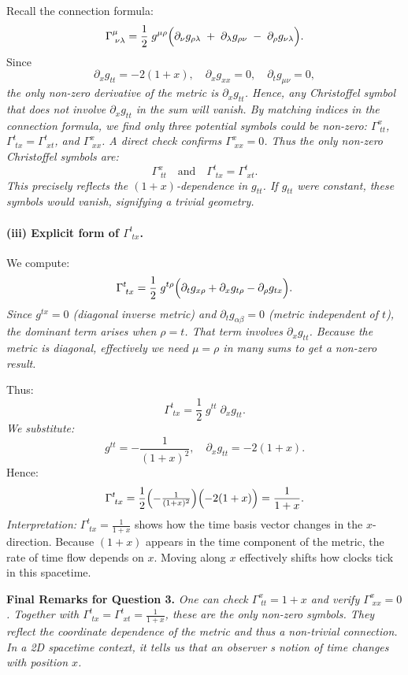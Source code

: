 Recall the connection formula:
\[
\Gamma^{\mu}_{\;\nu\lambda}
=
\frac{1}{2}\;g^{\mu\rho}
\Bigl(
\partial_\nu g_{\rho\lambda}
\;+\;
\partial_\lambda g_{\rho\nu}
\;-\;
\partial_\rho g_{\nu\lambda}
\Bigr).
\]
Since
\[
\partial_x g_{tt} = -2(1+x),
\quad
\partial_x g_{xx} = 0,
\quad
\partial_t g_{\mu\nu} = 0,
\]
\emph{the only non-zero derivative of the metric is \(\partial_x g_{tt}\). Hence, any Christoffel symbol that does not involve \(\partial_x g_{tt}\) in the sum will vanish. By matching indices in the connection formula, we find only three potential symbols could be non-zero: \(\Gamma^x_{\;tt}\), \(\Gamma^t_{\;tx} = \Gamma^t_{\;xt}\), and \(\Gamma^x_{\;xx}\). A direct check confirms \(\Gamma^x_{\;xx} = 0\). Thus the only non-zero Christoffel symbols are:}
\[
\Gamma^x_{\;tt}
\quad \text{and} \quad
\Gamma^t_{\;tx} = \Gamma^t_{\;xt}.
\]
\emph{This precisely reflects the \((1+x)\)-dependence in \(g_{tt}\). If \(g_{tt}\) were constant, these symbols would vanish, signifying a trivial geometry.}

\paragraph{(iii) Explicit form of \(\Gamma^{t}_{\;tx}\).}

We compute:
\[
\Gamma^{t}_{\;tx}
=
\frac{1}{2}\;g^{t\rho}
\Bigl(
\partial_t g_{x\rho}
+
\partial_x g_{t\rho}
-
\partial_\rho g_{tx}
\Bigr).
\]
\emph{Since \(g^{tx} = 0\) (diagonal inverse metric) and \(\partial_t g_{\alpha\beta} = 0\) (metric independent of \(t\)), the dominant term arises when \(\rho = t\). That term involves \(\partial_x g_{tt}\). Because the metric is diagonal, effectively we need \(\mu = \rho\) in many sums to get a non-zero result.}

Thus:
\[
\Gamma^{t}_{\;tx}
=
\frac{1}{2}\;g^{tt}\;\partial_x g_{tt}.
\]
\emph{We substitute:}
\[
g^{tt} = -\frac{1}{(1+x)^2},
\quad
\partial_x g_{tt} = -2(1+x).
\]
Hence:
\[
\Gamma^t_{\;tx}
=
\frac12
\Bigl(-\tfrac{1}{(1+x)^2}\Bigr)
\Bigl(-2(1+x)\Bigr)
=
\frac{1}{1+x}.
\]
\emph{Interpretation:}
\(\Gamma^{t}_{\;tx} = \frac{1}{1+x}\) shows how the time basis vector changes in the \(x\)-direction. Because \((1+x)\) appears in the time component of the metric, the rate of time flow depends on \(x\). Moving along \(x\) effectively shifts how clocks tick in this spacetime.

\bigskip

\textbf{Final Remarks for Question 3.}
\emph{One can check \(\Gamma^x_{\;tt} = 1 + x\) and verify \(\Gamma^x_{\;xx} = 0\). Together with \(\Gamma^t_{\;tx} = \Gamma^t_{\;xt} = \frac{1}{1+x}\), these are the only non-zero symbols. They reflect the coordinate dependence of the metric and thus a non-trivial connection. In a 2D  spacetime  context, it tells us that an observer s notion of time changes with position \(x\).}


